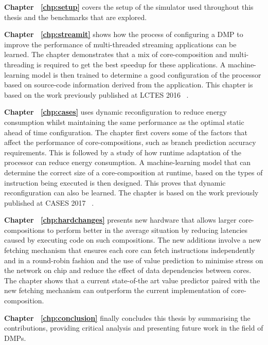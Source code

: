 \textbf{Chapter ~\ref{chp:setup}} covers the setup of the simulator used throughout this thesis and the benchmarks that are explored.

\textbf{Chapter ~\ref{chp:streamit}} shows how the process of configuring a DMP to improve the performance of multi-threaded streaming applications can be learned.
The chapter demonstrates that a mix of core-composition and multi-threading is required to get the best speedup for these applications.
A machine-learning model is then trained to determine a good configuration of the processor based on source-code information derived from the application.
This chapter is based on the work previously published at LCTES 2016 ~\cite{micolet2016dmpstream}.

\textbf{Chapter ~\ref{chp:cases}} uses dynamic reconfiguration to reduce energy consumption whilst maintaining the same performance as the optimal static ahead of time configuration.
The chapter first covers some of the factors that affect the performance of core-compositions, such as branch prediction accuracy requirements.
This is followed by a study of how runtime adaptation of the processor can reduce energy consumption.
A machine-learning model that can determine the correct size of a core-composition at runtime, based on the types of instruction being executed is then designed.
This proves that dynamic reconfiguration can also be learned.
The chapter is based on the work previously published at CASES 2017 ~\cite{micolet2017cases}.

\textbf{Chapter ~\ref{chp:hardchanges}} presents new hardware that allows larger core-compositions to perform better in the average situation by reducing latencies caused by executing code on such compositions.
The new additions involve a new fetching mechanism that ensures each core can fetch instructions independently and in a round-robin fashion and the use of value prediction to minimise stress on the network on chip and reduce the effect of data dependencies between cores.
The chapter shows that a current state-of-the art value predictor paired with the new fetching mechanism can outperform the current implementation of core-composition.

\textbf{Chapter ~\ref{chp:conclusion}} finally concludes this thesis by summarising the contributions, providing critical analysis and presenting future work in the field of DMPs.

